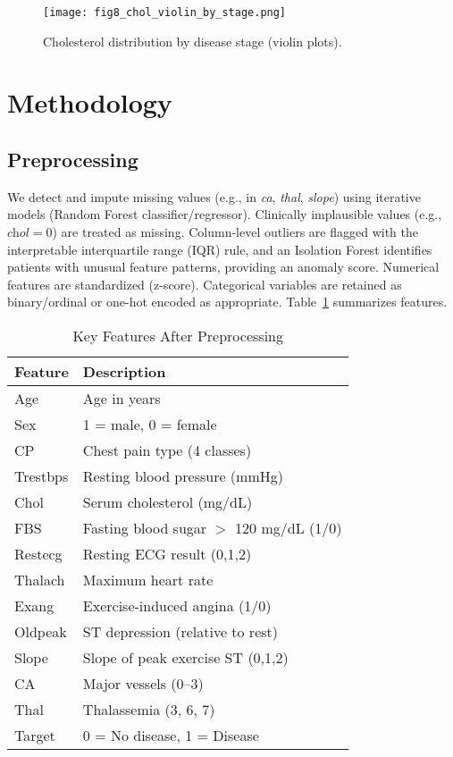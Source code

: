 \documentclass[conference]{IEEEtran}
\begin{document}
\begin{figure}[!t]
  \centering
  \texttt{[image: fig8\_chol\_violin\_by\_stage.png]}
  \caption{Cholesterol distribution by disease stage (violin plots).}
  \label{fig:cholvio}
\end{figure}

\section{Methodology}
\subsection{Preprocessing}
We detect and impute missing values (e.g., in \textit{ca}, \textit{thal}, \textit{slope}) using iterative models (Random Forest classifier/regressor). Clinically implausible values (e.g., \(\textit{chol}=0\)) are treated as missing. Column-level outliers are flagged with the interpretable interquartile range (IQR) rule, and an Isolation Forest identifies patients with unusual feature patterns, providing an anomaly score. Numerical features are standardized (z-score). Categorical variables are retained as binary/ordinal or one-hot encoded as appropriate. Table~\ref{tab:features} summarizes features.

\begin{table}[!t]
\centering
\caption{Key Features After Preprocessing}
\label{tab:features}
\begin{tabular}{@{}ll@{}}
\toprule
\textbf{Feature} & \textbf{Description} \\
\midrule
Age & Age in years \\
Sex & 1 = male, 0 = female \\
CP & Chest pain type (4 classes) \\
Trestbps & Resting blood pressure (mmHg) \\
Chol & Serum cholesterol (mg/dL) \\
FBS & Fasting blood sugar $>$ 120 mg/dL (1/0) \\
Restecg & Resting ECG result (0,1,2) \\
Thalach & Maximum heart rate \\
Exang & Exercise-induced angina (1/0) \\
Oldpeak & ST depression (relative to rest) \\
Slope & Slope of peak exercise ST (0,1,2) \\
CA & Major vessels (0--3) \\
Thal & Thalassemia (3, 6, 7) \\
Target & 0 = No disease, 1 = Disease \\
\bottomrule
\end{tabular}
\end{table}
\end{document}
